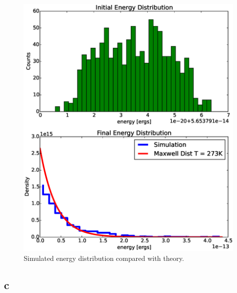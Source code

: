 \documentclass[12pt]{amsart}
\begin{document}
\begin{figure}[h!]
  \centering
    \includegraphics[width=1.0\textwidth]{energy_dist.eps}
    \caption{Simulated energy distribution compared with theory.}
\end{figure}

\subsection{c}
\end{document}
